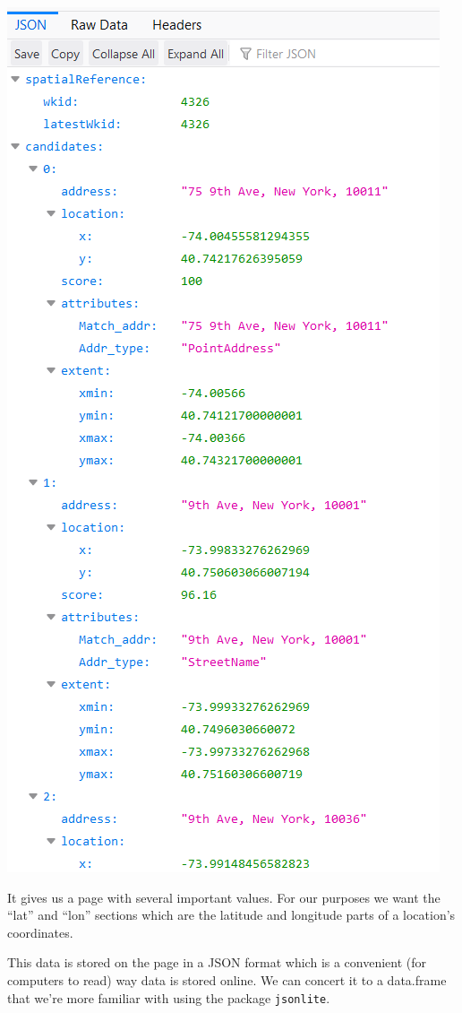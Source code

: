 \documentclass[
  12pt,
  openany]{book}
\begin{document}
\includegraphics{images/geocoding_1.PNG}

It gives us a page with several important values. For our purposes we want the ``lat'' and ``lon'' sections which are the latitude and longitude parts of a location's coordinates.

This data is stored on the page in a JSON format which is a convenient (for computers to read) way data is stored online. We can concert it to a data.frame that we're more familiar with using the package \texttt{jsonlite}.
\end{document}
